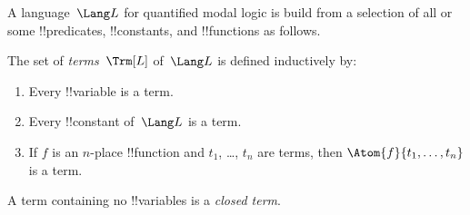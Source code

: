 \documentclass[../../../include/open-logic-section]{subfiles}
\begin{document}


A language~$\Lang L$ for quantified modal logic is 
build from a selection of all or some
!!{predicate}s, !!{constant}s, and !!{function}s as follows.

\begin{defn}[Terms]
The set of \emph{terms}~$\Trm[L]$ of~$\Lang L$ is
defined inductively by:
\begin{enumerate}
\item Every !!{variable} is a term.
\item Every !!{constant} of~$\Lang L$ is a term.
\item If $f$ is an $n$-place !!{function} and $t_1$, \dots, $t_n$
  are terms, then $\Atom{f}{t_1, \ldots, t_n}$ is a term.
\end{enumerate}
A term containing no !!{variable}s is a \emph{closed term}.
\end{defn}
\end{document}
